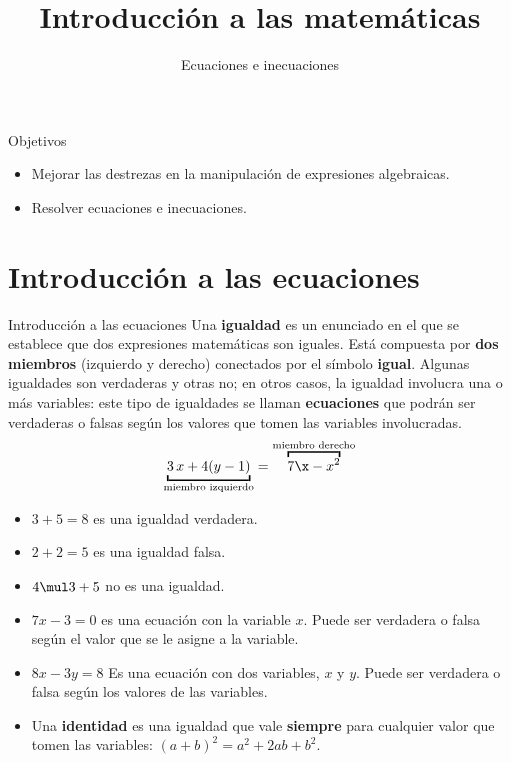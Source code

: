 \documentclass[9pt, aspectratio=169]{beamer}
\title{Introducción a las matemáticas}
\subtitle{Ecuaciones e inecuaciones}
\begin{document}
\maketitle

\begin{frame}{ Objetivos }
\begin{itemize}
    \item Mejorar las destrezas en la manipulación de expresiones algebraicas.
    \item Resolver ecuaciones e inecuaciones.
\end{itemize}
\end{frame}

\section{Introducción a las ecuaciones}

\begin{frame}{Introducción a las ecuaciones}
    Una \textbf{igualdad} es un enunciado en el que se establece que dos expresiones matemáticas son iguales. Está compuesta por \textbf{dos miembros} (izquierdo y derecho) conectados por el símbolo \textbf{igual}. Algunas igualdades son verdaderas y otras no; en otros casos, la igualdad involucra una o más variables: este tipo de igualdades se llaman \textbf{ecuaciones} que podrán ser verdaderas o falsas según los valores que tomen las variables involucradas.
    \[ \begin{underbracket}{3 \, x + 4(y-1)}_{\text{miembro izquierdo}} = \overbracket{7 \x - x^2}^{\text{miembro derecho}} \end{underbracket} \]
\pause

\begin{multicols}{2}
\begin{itemize}
    \item $3 + 5 = 8$ es una igualdad verdadera.
    \item $2 + 2 = 5$ es una igualdad falsa.
    \item $4 \mul 3 + 5$ no es una igualdad.
    \item $7 x - 3 = 0$ es una ecuación con la variable $x$. Puede ser verdadera o falsa según el valor que se le asigne a la variable.
    \item $8 x - 3 y = 8$ Es una ecuación con dos variables, $x$ y $y$. Puede ser verdadera o falsa según los valores de las variables.
    \item Una \textbf{identidad} es una igualdad que vale \textbf{siempre} para cualquier valor que tomen las variables: $(a + b)^2 = a^2 + 2 a b + b^2$.
\end{itemize}
\end{multicols}
\end{frame}
\end{document}
